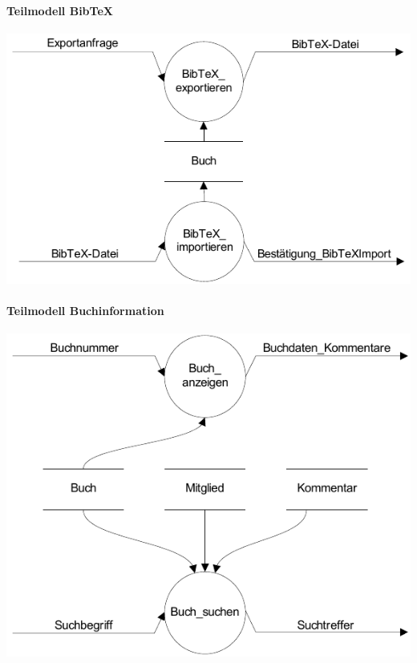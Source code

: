 \paragraph{Teilmodell BibTeX}
\includegraphics[scale=1.0]{teilmodell_bibtex}

\paragraph{Teilmodell Buchinformation}
\includegraphics[scale=1.0]{teilmodell_buchinformation}

